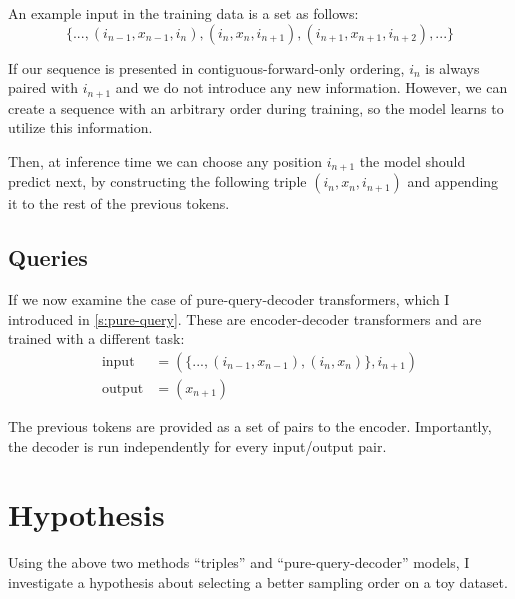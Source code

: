 

An example input in the training data is a set as follows:
$$
   \{ ..., (i_{n-1}, x_{n-1}, i_{n}), (i_{n}, x_{n}, i_{n+1}), (i_{n+1}, x_{n+1}, i_{n+2}), ... \}
$$


If our sequence is presented in contiguous-forward-only ordering, $i_n$ is always paired with $i_{n+1}$ and we do not introduce any new information. However, we can create a sequence with an arbitrary order during training, so the model learns to utilize this information.

Then, at inference time we can choose any position $i_{n+1}$ the model should predict next, by constructing the following triple $(i_n, x_n, i_{n+1})$ and appending it to the rest of the previous tokens.

\subsection{Queries}
\label{ss:cross-attn-queries}


If we now examine the case of pure-query-decoder transformers, which I introduced in \cref{s:pure-query}. These are encoder-decoder transformers and are trained with a different task:
\begin{align*}
    \text{input} &= (\{ ..., (i_{n-1}, x_{n-1}), (i_{n}, x_{n}) \}, i_{n+1}) \\
    \text{output} &= (x_{n+1})
\end{align*}

The previous tokens are provided as a set of pairs to the encoder. Importantly, the decoder is run independently for every input/output pair.


\section{Hypothesis}
\label{s:a-o-hypotheses}

Using the above two methods ``triples'' and ``pure-query-decoder'' models, I investigate a hypothesis about selecting a better sampling order on a toy dataset.

